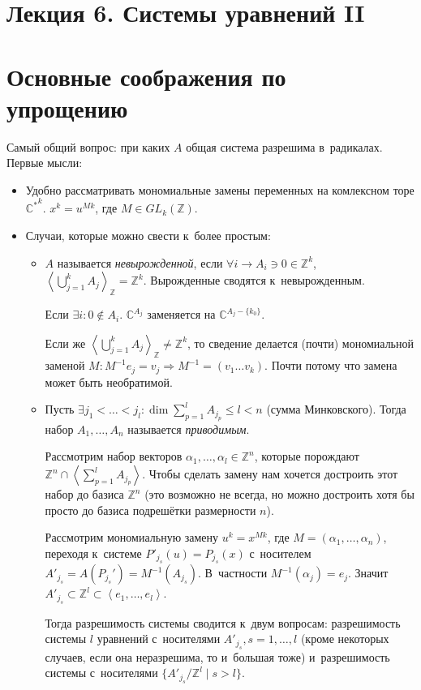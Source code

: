 \documentclass{article}
\begin{document}
\section*{Лекция 6. Системы уравнений II}

\section{Основные соображения по упрощению}

Самый общий вопрос: при каких $A$ общая система разрешима в~радикалах. Первые
мысли:
\begin{itemize}
	\item Удобно рассматривать мономиальные замены переменных на комлексном торе
		${\mathbb{C}^\ast}^k$. $x^k = u^{Mk}$, где $M \in GL_k(\mathbb{Z})$.
	\item Случаи, которые можно свести к~более простым:
		\begin{itemize}
			\item $A$ называется \emph{невырожденной}, если $\forall i \rightarrow
				A_i \ni 0 \in \mathbb{Z}^k$, $\left< \bigcup\limits_{j=1}^k A_j
				\right>_\mathbb{Z} = \mathbb{Z}^k$. Вырожденные сводятся к~невырожденным.

				Если $\exists i: 0 \notin A_i$. $\mathbb{C}^{A_j}$ заменяется на
				$\mathbb{C}^{A_j - \{k_0\}}$.

				Если же $\left< \bigcup\limits_{j=1}^k A_j \right>_\mathbb{Z} \ne
				\mathbb{Z}^k$, то сведение делается (почти) мономиальной заменой
				$M: M^{-1} e_j = v_j \Rightarrow M^{-1} = (v_1 \ldots v_k)$. Почти
				потому что замена может быть необратимой.
			\item Пусть $\exists j_1 < \ldots < j_l: \dim \sum\limits_{p=1}^l A_{j_p}
				\le l < n$ (сумма Минковского). Тогда набор $A_1, \ldots, A_n$ называется
				\emph{приводимым}.

				Рассмотрим набор векторов $\alpha_1, \ldots, \alpha_l
				\in \mathbb{Z}^n$, которые порождают $\mathbb{Z}^n \cap \left<
				\sum\limits_{p=1}^l A_{j_p} \right>$. Чтобы сделать замену нам хочется
				достроить этот набор до базиса $\mathbb{Z}^n$ (это возможно не всегда,
				но можно достроить хотя бы просто до базиса подрешётки размерности $n$).

				Рассмотрим мономиальную замену $u^k = x^{Mk}$, где $M = (\alpha_1,
				\ldots, \alpha_n)$, переходя к~системе $P'_{j_s}(u) = P_{j_s}(x)$
				с~носителем $A'_{j_s} = A(P_{j_s}') = M^{-1}(A_{j_s})$. В~частности
				$M^{-1}(\alpha_j) = e_j$. Значит $A'_{j_s} \subset \mathbb{Z}^l \subset
				\left< e_1, \ldots, e_l \right>$.

				Тогда разрешимость системы сводится к~двум вопросам: разрешимость
				системы $l$ уравнений с~носителями $A'_{j_s}, s = 1, \ldots, l$ (кроме
				некоторых случаев, если она неразрешима, то и~большая тоже)
				и~разрешимость системы с~носителями $\{ A'_{j_s} / {\mathbb{Z}^l} \mid s
				> l\}$.
		\end{itemize}
\end{itemize}
\end{document}
